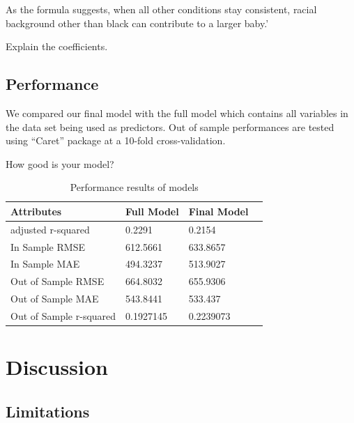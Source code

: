 \documentclass[9pt,twocolumn,twoside,]{pnas-new}
\begin{document}
As the formula suggests, when all other conditions stay consistent,
racial background other than black can contribute to a larger baby.'

Explain the coefficients.

\hypertarget{performance}{%
\subsection*{Performance}\label{performance}}

We compared our final model with the full model which contains all
variables in the data set being used as predictors. Out of sample
performances are tested using ``Caret'' package at a 10-fold
cross-validation.

How good is your model?

\begin{table}[h]
\caption{Performance results of models}
\centering
\begin{tabular}{|l|l|l|l|}
\hline
\textbf{Attributes} & \textbf{Full Model} & \textbf{Final Model} \\ \hline
adjusted r-squared & 0.2291 & 0.2154 \\ \hline
In Sample RMSE & 612.5661 & 633.8657 \\ \hline
In Sample MAE & 494.3237 & 513.9027 \\ \hline
Out of Sample RMSE & 664.8032 & 655.9306 \\ \hline
Out of Sample MAE & 543.8441 & 533.437 \\ \hline
Out of Sample r-squared & 0.1927145 & 0.2239073 \\ \hline
\end{tabular}
\end{table}

\hypertarget{discussion}{%
\section*{Discussion}\label{discussion}}

\hypertarget{limitations}{%
\subsection*{Limitations}\label{limitations}}
\end{document}
